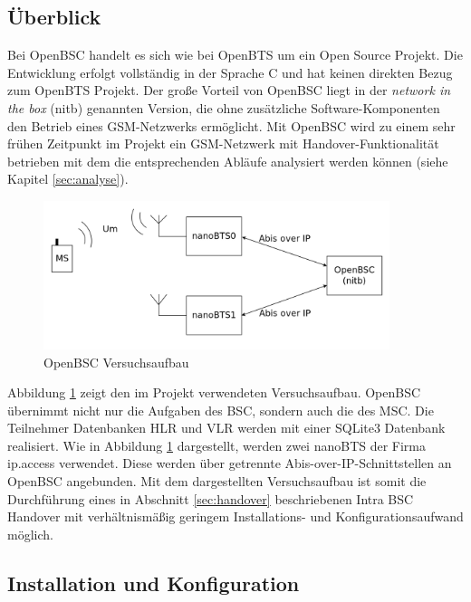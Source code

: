 \label{sec:openbsc}

\subsection{Überblick}

Bei OpenBSC handelt es sich wie bei OpenBTS um ein Open Source Projekt. Die Entwicklung erfolgt vollständig in der Sprache C und hat keinen direkten Bezug zum OpenBTS Projekt. Der große Vorteil von OpenBSC liegt in der \textit{network in the box} (nitb) genannten Version, die ohne zusätzliche Software-Komponenten den Betrieb eines GSM-Netzwerks ermöglicht. Mit OpenBSC wird zu einem sehr frühen Zeitpunkt im Projekt ein GSM-Netzwerk mit Handover-Funktionalität betrieben mit dem die entsprechenden Abläufe analysiert werden können (siehe Kapitel \ref{sec:analyse}).

\begin{figure}[h!]
  \centering
  \includegraphics[width=0.9\textwidth]{img/openbscarch}
  \caption{OpenBSC Versuchsaufbau}
  \label{fig:openbscarch}
\end{figure}

Abbildung \ref{fig:openbscarch} zeigt den im Projekt verwendeten Versuchsaufbau. OpenBSC übernimmt nicht nur die Aufgaben des BSC, sondern auch die des MSC. Die Teilnehmer Datenbanken HLR und VLR werden mit einer SQLite3 Datenbank realisiert. Wie in Abbildung \ref{fig:openbscarch} dargestellt, werden zwei nanoBTS der Firma ip.access verwendet. Diese werden über getrennte Abis-over-IP-Schnittstellen an OpenBSC angebunden. Mit dem dargestellten Versuchsaufbau ist somit die Durchführung eines in Abschnitt \ref{sec:handover} beschriebenen Intra BSC Handover mit verhältnismäßig geringem Installations- und Konfigurationsaufwand möglich.

\subsection{Installation und Konfiguration}

